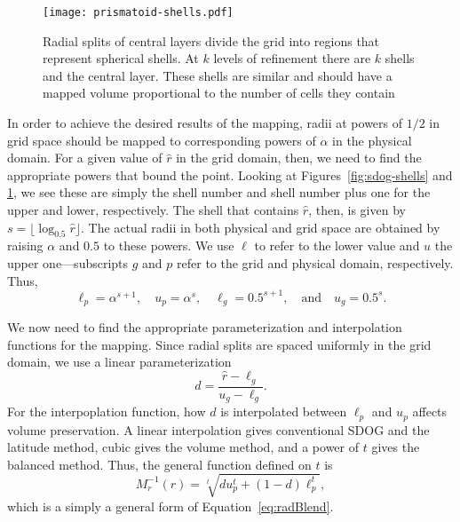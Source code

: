 \begin{figure}[ht!]
	\centering
	\texttt{[image: prismatoid-shells.pdf]}
	\caption[Spherical shells that result from the grid extension method]{
		Radial splits of central layers divide the grid into regions that represent spherical shells.
		At $k$ levels of refinement there are $k$ shells and the central layer.
		These shells are similar and should have a mapped volume proportional to the number of cells they contain
	}
	\label{fig:prismatoid-shells}
\end{figure}

In order to achieve the desired results of the mapping, radii at powers of $1/2$ in grid space should be mapped to corresponding powers of $\alpha$ in the physical domain.
For a given value of $\hat{r}$ in the grid domain, then, we need to find the appropriate powers that bound the point.
Looking at Figures~\ref{fig:sdog-shells} and \ref{fig:prismatoid-shells}, we see these are simply the shell number and shell number plus one for the upper and lower, respectively.
The shell that contains $\hat{r}$, then, is given by $s = \lfloor \log_{0.5} \hat{r} \rfloor$.
The actual radii in both physical and grid space are obtained by raising $\alpha$ and $0.5$ to these powers.
We use $\ell$ to refer to the lower value and $u$ the upper one---subscripts $g$ and $p$ refer to the grid and physical domain, respectively.
Thus,
%
\begin{equation*}
\ell_p = \alpha^{s + 1}, \quad u_p = \alpha^s, \quad \ell_g = 0.5^{s + 1}, \quad \text{and} \quad u_g = 0.5^s.
\end{equation*}
%

We now need to find the appropriate parameterization and interpolation functions for the mapping.
Since radial splits are spaced uniformly in the grid domain, we use a linear parameterization
%
\begin{equation} \label{eq:radialInvD}
d = \frac{ \hat{r} - \ell_g }{ u_g - \ell_g }.
\end{equation}
%
For the interpoplation function, how $d$ is interpolated between $\ell_p$ and $u_p$ affects volume preservation.
A linear interpolation gives conventional SDOG and the latitude method, cubic gives the volume method, and a power of $t$ gives the balanced method.
Thus, the general function defined on $t$ is
%
\begin{equation} \label{eq:radialInv}
M_r^{-1}(\hat{r}) = \sqrt[t]{ d u_p^{t} + \left( 1 - d \right) \ell_p^{t} },
\end{equation}
%
which is a simply a general form of Equation~\ref{eq:radBlend}.


